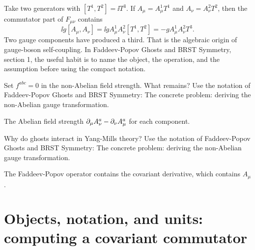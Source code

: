 \begin{example}
Take two generators with \([T^1,T^2]=\ii T^3\).  If \(A_\mu=A_\mu^1T^1\) and \(A_\nu=A_\nu^2T^2\), then the commutator part of \(F_{\mu\nu}\) contains
\[
  \ii g[A_\mu,A_\nu]=\ii gA_\mu^1A_\nu^2[T^1,T^2]=-gA_\mu^1A_\nu^2T^3.
\]
Two gauge components have produced a third.  That is the algebraic origin of gauge-boson self-coupling.  In Faddeev-Popov Ghosts and BRST Symmetry, section 1, the useful habit is to name the object, the operation, and the assumption before using the compact notation.
\end{example}



\begin{exercise}
Set \(f^{abc}=0\) in the non-Abelian field strength.  What remains?  Use the notation of Faddeev-Popov Ghosts and BRST Symmetry: The concrete problem: deriving the non-Abelian gauge transformation.
\begin{answer}
The Abelian field strength \(\partial_\mu A_\nu^a-\partial_\nu A_\mu^a\) for each component.
\end{answer}
\end{exercise}

\begin{exercise}
Why do ghosts interact in Yang-Mills theory?  Use the notation of Faddeev-Popov Ghosts and BRST Symmetry: The concrete problem: deriving the non-Abelian gauge transformation.
\begin{answer}
The Faddeev-Popov operator contains the covariant derivative, which contains \(A_\mu\).
\end{answer}
\end{exercise}



\section{Objects, notation, and units: computing a covariant commutator}













